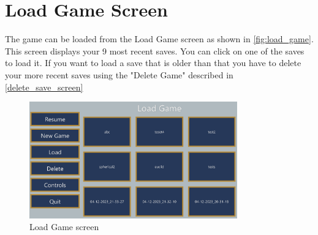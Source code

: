 \section{Load Game Screen}
The game can be loaded from the Load Game screen as shown in \autoref{fig:load_game}.
This screen displays your 9 most recent saves.
You can click on one of the saves to load it.
If you want to load a save that is older than that you have to delete your more recent saves using the "Delete Game" described in \autoref{delete_save_screen}

\begin{figure}[H]
    \centering
    \includegraphics[width=0.8\textwidth]{chapters/user_manual/resources/load-game.png}
    \caption{Load Game screen}
    \label{fig:load_game}
\end{figure}